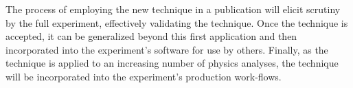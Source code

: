 The process of employing the new technique in a publication will elicit scrutiny by the full experiment, effectively validating the technique. Once the technique is accepted, it can be generalized beyond this first application and then incorporated into the experiment's software for use by others. Finally, as the technique is applied to an increasing number of physics analyses, the technique will be incorporated into the experiment's production work-flows.


